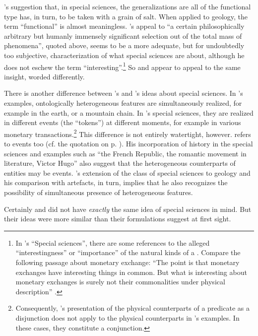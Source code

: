 \documentclass[output=paper]{langscibook}
\begin{document}
{\Fodor}'s suggestion that, in special sciences, the generalizations are all of the functional type has, in turn, to be taken with a grain of salt. When applied to geology, the term ``functional'' is almost meaningless. {\Sapir}'s appeal to ``a certain philosophically arbitrary but humanly immensely significant selection out of the total mass of phenomena'', quoted above, seems to be a more adequate, but for {\Fodor} undoubtedly too subjective, characterization of what special sciences are about, although he does not eschew the term ``interesting''.\footnote{In {\Fodor}'s ``Special sciences'', there are some references to the alleged ``interestingness'' or ``importance'' of the natural kinds of a . Compare the following passage about monetary exchange: ``The point is that monetary exchanges have interesting things in common. But what is interesting about monetary exchanges is surely not their commonalities under physical description'' \citep[103--104]{Fodor1974}.} So {\Sapir} and {\Fodor} appear to appeal to the same insight, worded differently.

There is another difference between {\Sapir}'s and {\Fodor}'s ideas about special sciences. In {\Sapir}'s examples, ontologically heterogeneous features are simultaneously realized, for example in the earth, or a mountain chain. In {\Fodor}'s special sciences, they are realized in different events (the ``tokens'') at different moments, for example in various monetary transactions.\footnote{Consequently, {\Fodor}'s presentation of the physical counterparts of a  predicate as a disjunction does not apply to the physical counterparts in {\Sapir}'s examples. In these cases, they constitute a conjunction.} This difference is not entirely watertight, however. {\Sapir} refers to events too (cf. the quotation on p. \pageref{q:elffers:sapirquote}). His incorporation of history in the special sciences and examples such as ``the French Republic, the romantic movement in literature, Victor Hugo'' also suggest that the heterogeneous counterparts of  entities may be events. {\Fodor}'s extension of the class of special sciences to geology and his comparison with artefacts, in turn, implies that he also recognizes the possibility of simultaneous presence of heterogeneous features.

Certainly {\Sapir} and {\Fodor} did not have \emph{exactly} the same idea of special sciences in mind. But their ideas were more similar than their formulations suggest at first sight.
\end{document}
